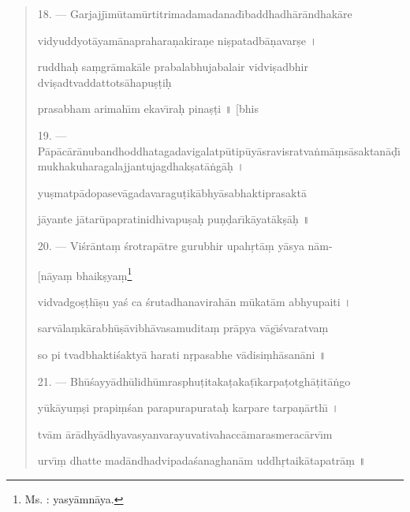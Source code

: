 \documentclass[a4paper, 11pt, oneside, french, landscape, twocolumn]{article}
\begin{document}
\begin{quotation}
18. --- Garjajj\={\i}m\={u}tam\={u}rtitrimadamadanad\={\i}baddhadh\={a}r\={a}ndhak\={a}re

vidyuddyot\={a}yam\={a}naprahara\d{n}akira\d{n}e ni\d{s}patadb\={a}\d{n}avar\d{s}e \texthindi{।}

ruddha\d{h} sa\d{m}gr\={a}mak\={a}le prabalabhujabalair vidvi\d{s}adbhir dvi\d{s}adtvaddattots\={a}hapu\d{s}\d{t}i\d{h}

prasabham arimah\={\i}m ekav\={\i}ra\d{h} pina\d{s}\d{t}i \texthindi{॥} [bhis

\bigskip

19. --- P\={a}p\={a}c\={a}r\={a}nubandhoddhatagadavigalatp\={u}tip\={u}y\={a}sravisratva\.{n}m\={a}\d{m}s\={a}saktan\={a}\d{d}\={\i}mukhakuharagalajjantujagdhak\d{s}at\={a}\.{n}g\={a}\d{h} \texthindi{।}

yu\d{s}matp\={a}dopasev\={a}gadavaragu\d{t}ik\={a}bhy\={a}sabhaktiprasakt\={a}

j\={a}yante j\={a}tar\={u}papratinidhivapu\d{s}a\d{h} pu\d{n}\d{d}ar\={\i}k\={a}yat\={a}k\d{s}\={a}\d{h} \texthindi{॥}

\bigskip

20. --- Vi\'{s}r\={a}nta\d{m} \'{s}rotrap\={a}tre gurubhir upah\d{r}t\={a}\d{m} y\={a}sya n\={a}m-

\hspace*{55mm}[n\={a}ya\d{m} bhaik\d{s}ya\d{m}\footnote{Ms. : yasy\={a}mn\={a}ya.}

vidvadgo\d{s}\d{t}h\={\i}\d{s}u ya\'{s} ca \'{s}rutadhanavirah\={a}n m\={u}kat\={a}m abhyupaiti \texthindi{।}

sarv\={a}la\d{m}k\={a}rabh\={u}\d{s}\={a}vibh\={a}vasamudita\d{m} pr\={a}pya v\={a}g\={\i}\'{s}varatva\d{m}

so pi tvadbhakti\'{s}akty\={a} harati n\d{r}pasabhe v\={a}disi\d{m}h\={a}san\={a}ni \texthindi{॥}

\bigskip

21. --- Bh\={u}\'{s}ayy\={a}dh\={u}lidh\={u}mrasphu\d{t}itaka\d{t}aka\d{t}\={\i}karpa\d{t}otgh\={a}\d{t}it\={a}\.{n}go

y\={u}k\={a}yu\d{m}\d{s}i prapi\d{m}\'{s}an parapurapurata\d{h} karpare tarpa\d{n}\={a}rth\={\i} \texthindi{।}

tv\={a}m \={a}r\={a}dhy\={a}dhyavasyanvarayuvativahacc\={a}marasmerac\={a}rv\={\i}m

urv\={\i}\d{m} dhatte mad\={a}ndhadvipada\'{s}anaghan\={a}m uddh\d{r}taik\={a}tapatr\={a}\d{m} \texthindi{॥}

\bigskip


\end{quotation}
\end{document}
